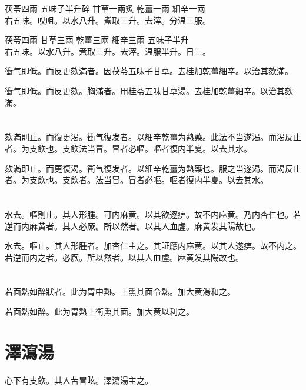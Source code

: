 茯苓{\scriptsize 四兩} 五味子{\scriptsize 半升碎} 甘草{\scriptsize 一兩炙} 乾薑{\scriptsize 一兩} 細辛{\scriptsize 一兩}\\
右五味。㕮咀。以水八升。煮取三升。去滓。分温三服。{\wuben}

茯苓{\scriptsize 四兩} 甘草{\scriptsize 三兩} 乾薑{\scriptsize 三兩} 細辛{\scriptsize 三兩} 五味子{\scriptsize 半升}\\
右五味。以水八升。煮取三升。去滓。温服半升。日三。{\dengben}

衝气即低。而反更欬滿者。因茯苓五味子甘草。去桂加乾薑細辛。以治其欬滿。{\wuben}

衝气即低。而反更欬。胸滿者。用桂苓五味甘草湯。去桂加乾薑細辛。以治其欬滿。{\dengben}

\section{}

欬滿則止。而復更渴。衝气復发者。以細辛乾薑为熱藥。此法不当遂渴。而渴反止者。为支飲也。支飲法当冒。冒者必嘔。嘔者復内半夏。以去其水。{\wuben}

欬滿即止。而更復渴。衝气復发者。以細辛乾薑为熱藥也。服之当遂渴。而渴反止者。为支飲也。支飲者。法当冒。冒者必嘔。嘔者復内半夏。以去其水。{\dengben}

\section{}

水去。嘔則止。其人形腫。可内麻黄。以其欲逐痹。故不内麻黄。乃内杏仁也。若逆而内麻黄者。其人必厥。所以然者。以其人血虗。麻黄发其陽故也。{\wuben}

水去。嘔止。其人形腫者。加杏仁主之。其証應内麻黄。以其人遂痹。故不内之。若逆而内之者。必厥。所以然者。以其人血虗。麻黄发其陽故也。{\dengben}

\section{}

若面熱如醉狀者。此为胃中熱。上熏其面令熱。加大黄湯和之。{\wuben}

若面熱如醉。此为胃熱上衝熏其面。加大黄以利之。{\dengben}

\section{澤瀉湯}

心下有支飲。其人苦冒眩。澤瀉湯主之。

